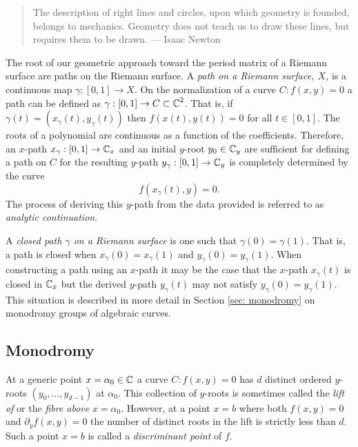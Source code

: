 \begin{quote}
  The description of right lines and circles, upon which geometry is founded,
  belongs to mechanics. Geometry does not teach us to draw these lines, but
  requires them to be drawn. --- Isaac Newton
\end{quote}

The root of our geometric approach toward the period matrix of a Riemann surface
are paths on the Riemann surface. A {\it path on a Riemann surface, $X$,} is a
continuous map $\gamma : [0,1] \to X$. On the normalization of a curve $C:
f(x,y) = 0$ a path can be defined as $\gamma : [0,1] \to C \subset \operatorname{\mathbb{C}}^2$. That
is, if $\gamma(t) = (x_\gamma(t), y_\gamma(t))$ then $f(x(t),y(t)) = 0$ for all
$t \in [0,1]$. The roots of a polynomial are continuous as a function of the
coefficients. Therefore, an $x$-path $x_\gamma : [0,1] \to \operatorname{\mathbb{C}}_x$ and an initial
$y$-root $y_0 \in \operatorname{\mathbb{C}}_y$ are sufficient for defining a path on $C$ for the
resulting $y$-path $y_\gamma : [0,1] \to \operatorname{\mathbb{C}}_y$ is completely determined by the
curve
\[
  f(x_\gamma(t),y) = 0.
\]
The process of deriving this $y$-path from the data provided is referred to as
{\it analytic continuation}.

A {\it closed path $\gamma$ on a Riemann surface} is one such that $\gamma(0) =
\gamma(1)$. That is, a path is closed when $x_\gamma(0) = x_\gamma(1)$ and
$y_\gamma(0) = y_\gamma(1)$. When constructing a path using an $x$-path it may
be the case that the $x$-path $x_\gamma(t)$ is closed in $\operatorname{\mathbb{C}}_x$ but the derived
$y$-path $y_\gamma(t)$ may not satisfy $y_\gamma(0) = y_\gamma(1)$. This
situation is described in more detail in Section \ref{sec: monodromy} on
monodromy groups of algebraic curves.


\subsection{Monodromy}\label{subsec:background-monodromy}

At a generic point $x = \alpha_0 \in \operatorname{\mathbb{C}}$ a curve $C : f(x,y) = 0$ has $d$
distinct ordered $y$-roots $(y_0,\ldots,y_{d-1})$ at $\alpha_0$. This collection
of $y$-roots is sometimes called the {\it lift of} or the {\it fibre above}
$x=\alpha_0$. However, at a point $x=b$ where both $f(x,y) = 0$ and $\partial_y
f(x,y) = 0$ the number of distinct roots in the lift is strictly less than $d$.
Such a point $x = b$ is called a {\it discriminant point} of $f$.

